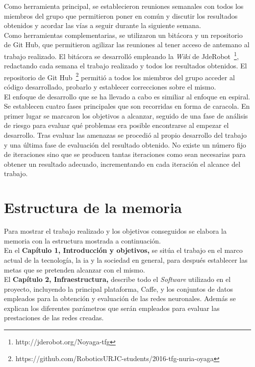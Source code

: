 Como herramienta principal, se establecieron reuniones semanales con todos los miembros del grupo que permitieron poner en común y discutir los resultados obtenidos y acordar las vías a seguir durante la siguiente semana.\\

Como herramientas complementarias, se utilizaron un bitácora y un repositorio de Git Hub, que permitieron agilizar las reuniones al tener acceso de antemano al trabajo realizado. El bitácora se desarrolló empleando la \textit{Wiki} de JdeRobot~\footnote{http://jderobot.org/Noyaga-tfg}, redactando cada semana el trabajo realizado y todos los resultados obtenidos. El repositorio de Git Hub~\footnote{https://github.com/RoboticsURJC-students/2016-tfg-nuria-oyaga} permitió a todos los miembros del grupo acceder al código desarrollado, probarlo y establecer correcciones sobre el mismo.\\

El enfoque de desarrollo que se ha llevado a cabo es similiar al enfoque en espiral. Se establecen cuatro fases principales que son recorridas en forma de caracola. En primer lugar se marcaron los objetivos a alcanzar, seguido de una fase de análisis de riesgo para evaluar qué problemas era posible encontrarse al empezar el desarrollo. Tras evaluar las amenazas se procedió al propio desarrollo del trabajo y una última fase de evaluación del resultado obtenido. No existe un número fijo de iteraciones sino que se producen tantas iteraciones como sean necesarias para obtener un resultado adecuado, incrementando en cada iteración el alcance del trabajo.

\section{Estructura de la memoria}
Para mostrar el trabajo realizado y los objetivos conseguidos se elabora la memoria con la estructura mostrada a continuación.\\

En el \textbf{Capítulo 1, Introducción y objetivos,} se sitúa el trabajo en el marco actual de la tecnología, la \acrshort{ia} y la sociedad en general, para después establecer las metas que se pretenden alcanzar con el mismo.\\

El \textbf{Capítulo 2, Infraestructura,} describe todo el \textit{Software} utilizado en el proyecto, incluyendo la principal plataforma, Caffe, y los conjuntos de datos empleados para la obtención y evaluación de las redes neuronales. Además se explican los diferentes parámetros que serán empleados para evaluar las prestaciones de las redes creadas.\\

